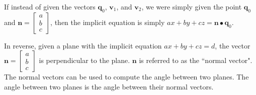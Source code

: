 \documentclass{article}
\begin{document}
If instead of given the vectors \(\mathbf{q}_0\), \(\mathbf{v}_1\), and \(\mathbf{v}_2\), we were simply given the point \(\mathbf{q}_0\) and \(\mathbf{n} = \begin{bmatrix} a \\ b \\ c \end{bmatrix}\), then the implicit equation is simply \(ax + by + cz = \mathbf{n} \bullet \mathbf{q}_0\).

In reverse, given a plane with the implicit equation \(ax + by + cz = d\), the vector \(\mathbf{n} = \begin{bmatrix} a \\ b \\ c \end{bmatrix}\) is perpendicular to the plane. \(\mathbf{n}\) is referred to as the ``normal vector". The normal vectors can be used to compute the angle between two planes. The angle between two planes is the angle between their normal vectors.
\end{document}
